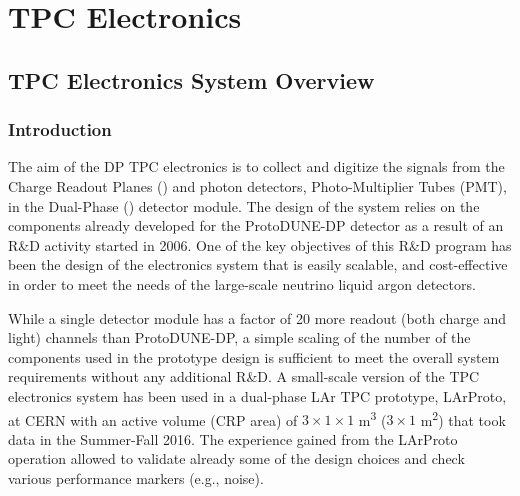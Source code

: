 \chapter{TPC Electronics}
\label{ch:fddp-tpc-elec}


\section{TPC Electronics System Overview}
\label{sec:fddp-tpc-elec-ov}

\subsection{Introduction}
\label{sec:fddp-tpc-elec-intro}

The aim of the DP TPC electronics is to collect and digitize the signals from the Charge Readout Planes () and photon detectors, Photo-Multiplier Tubes (PMT), in the Dual-Phase () detector module. The design of the system relies on the components already developed for the ProtoDUNE-DP detector as a result of an R\&D activity started in 2006. One of the key objectives of this R\&D program has been the design of the electronics system that is easily scalable, and cost-effective in order to meet the needs of the large-scale neutrino liquid argon detectors.  

While a single  detector module has a factor of \num{20} more readout (both charge and light) channels than ProtoDUNE-DP, a simple scaling of the number of the components used in the prototype design is sufficient to meet the overall system requirements without any additional R\&D. A small-scale version of the TPC electronics system has been used in a dual-phase LAr TPC prototype, LArProto, at CERN with an active volume (CRP area) of $3\times 1 \times 1$ \si{\meter\cubed} ($3\times1$ \si{\meter\squared}) that took data in the Summer-Fall 2016. The experience gained from the LArProto operation allowed to validate already some of the design choices and check various performance markers (e.g., noise). 

